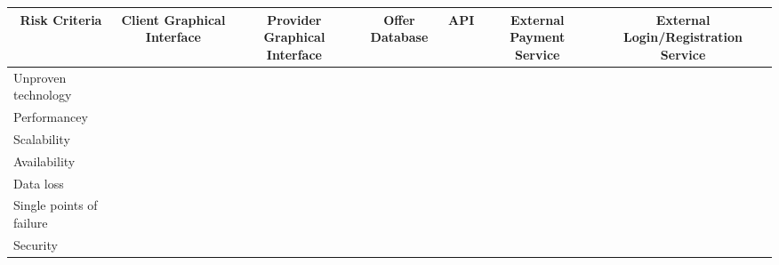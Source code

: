 \newpage
\thispagestyle{lscape}
\begin{landscape}

    \begin{table}[H]
        \begin{tabularx}{\textwidth}{|X|c|c|c|c|c|c|}
            \toprule
            \multicolumn{1}{c}{\textbf{Risk Criteria} } & \multicolumn{1}{X}{Client Graphical Interface} & \multicolumn{1}{X}{Provider Graphical Interface} &
            \multicolumn{1}{c}{Offer Database } & \multicolumn{1}{c}{API} & \multicolumn{1}{X}{External Payment Service}  &
            \multicolumn{1}{c}{External Login/Registration Service} \\
            \midrule
            Unproven technology         &  &  &  &  &  & \\
            \hline
            Performancey                &  &  &  &  &  & \\
            \hline
            Scalability                 &  &  &  &  &  & \\
            \hline
            Availability                &  &  &  &  &  & \\
            \hline
            Data loss                   &  &  &  &  &  & \\
            \hline
            Single points of failure    &  &  &  &  &  & \\
            \hline
            Security                    &  &  &  &  &  & \\
            \hline
            \bottomrule
        \end{tabularx}
    \end{table}

\end{landscape}






